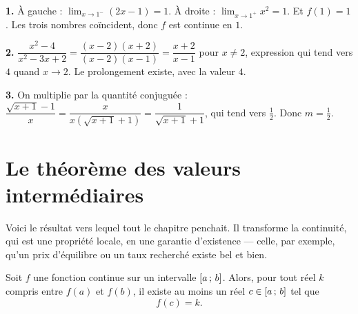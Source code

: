 \begin{corrige}
\textbf{1.} À gauche : $\lim_{x \to 1^{-}} (2x-1) = 1$. À droite :
$\lim_{x \to 1^{+}} x^{2} = 1$. Et $f(1) = 1$. Les trois nombres coïncident,
donc $f$ est continue en $1$.

\textbf{2.} $\dfrac{x^{2}-4}{x^{2}-3x+2} = \dfrac{(x-2)(x+2)}{(x-2)(x-1)} = \dfrac{x+2}{x-1}$
pour $x \neq 2$, expression qui tend vers $4$ quand $x \to 2$. Le prolongement
existe, avec la valeur $4$.

\textbf{3.} On multiplie par la quantité conjuguée :
$\dfrac{\sqrt{x+1}-1}{x} = \dfrac{x}{x\left(\sqrt{x+1}+1\right)} = \dfrac{1}{\sqrt{x+1}+1}$,
qui tend vers $\tfrac{1}{2}$. Donc $m = \tfrac{1}{2}$.
\end{corrige}

\section{Le théorème des valeurs intermédiaires}

Voici le résultat vers lequel tout le chapitre penchait. Il transforme la
continuité, qui est une propriété locale, en une garantie d'existence — celle,
par exemple, qu'un prix d'équilibre ou un taux recherché existe bel et bien.

\begin{theoreme}
Soit $f$ une fonction continue sur un intervalle $\left[a\,;\,b\right]$. Alors,
pour tout réel $k$ compris entre $f(a)$ et $f(b)$, il existe au moins un réel
$c \in \left[a\,;\,b\right]$ tel que
\[
  f(c) = k .
\]
\end{theoreme}

